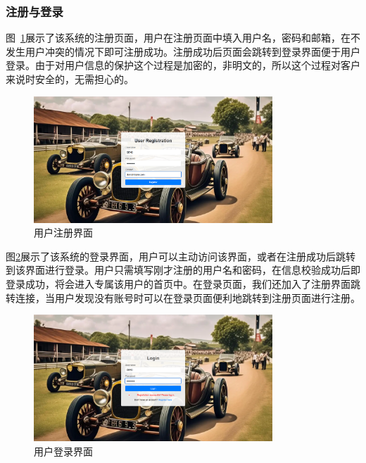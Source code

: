 \documentclass[UTF8,a4paper,12pt]{ctexart}
\begin{document}
\subsubsection{注册与登录}
图~\ref{fig:reg}展示了该系统的注册页面，用户在注册页面中填入用户名，密码和邮箱，在不发生用户冲突的情况下即可注册成功。注册成功后页面会跳转到登录界面便于用户登录。由于对用户信息的保护这个过程是加密的，非明文的，所以这个过程对客户来说时安全的，无需担心的。
\begin{figure}[htbp]  %
    \centering  %
    \includegraphics[width=0.8\textwidth]{pic/reg.png}
    \caption{用户注册界面}  %
    \label{fig:reg}  %
\end{figure}

图\ref{fig:log}展示了该系统的登录界面，用户可以主动访问该界面，或者在注册成功后跳转到该界面进行登录。用户只需填写刚才注册的用户名和密码，在信息校验成功后即登录成功，将会进入专属该用户的首页中。在登录页面，我们还加入了注册界面跳转连接，当用户发现没有账号时可以在登录页面便利地跳转到注册页面进行注册。
\begin{figure}[htbp]  %
    \centering  %
    \includegraphics[width=0.8\textwidth]{pic/log.png}
    \caption{用户登录界面}  %
    \label{fig:log}  %
\end{figure}
\end{document}
